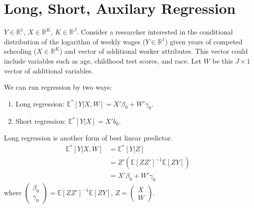 \documentclass[11pt]{elegantbook}
\begin{document}
\section{Long, Short, Auxilary Regression}
$Y\in \mathbb{R}^{1}$, $X\in \mathbb{R}^{K}$, $K\in \mathbb{R}^{J}$.
Consider a researcher interested in the conditional distribution of the logarithm of weekly wages ($Y\in \mathbb{R}^{1}$) given years of competed schooling ($X\in \mathbb{R}^{K}$) and vector of additional worker attributes. This vector could include variables such as age, childhood test scores, and race. Let $W$ be this $J \times 1$ vector of additional variables.

We can run regression by two ways:
\begin{enumerate}
    \item Long regression: $\mathbb{E}^*[Y|X,W]=X'\beta_0+W'\gamma_0$.
    \item Short regression: $\mathbb{E}^*[Y|X]=X'b_0$.
\end{enumerate}
\begin{proposition}
    Long regression is another form of best linear predictor.
    \begin{equation}
        \begin{aligned}
            \mathbb{E}^*[Y|X,W]&=\mathbb{E}^*[Y|Z]\\
            &=Z'\left(\mathbb{E}[ZZ']^{-1}\mathbb{E}[ZY]\right)\\
            &=X'\beta_0+W'\gamma_0
        \end{aligned}
        \nonumber
    \end{equation}
    where $\begin{pmatrix}
        \beta_0\\
        \gamma_0
    \end{pmatrix}=\mathbb{E}[ZZ']^{-1}\mathbb{E}[ZY]$, $Z=\begin{pmatrix}
        X\\
        W
    \end{pmatrix}$.
\end{proposition}
\end{document}
